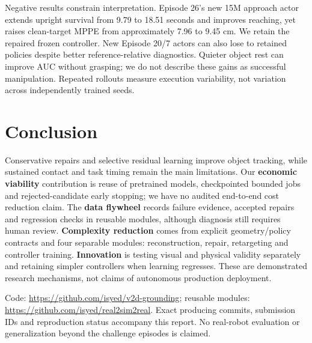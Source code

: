\documentclass[10pt]{nvidiaextabstract}
\begin{document}
Negative results constrain interpretation. Episode 26's new 15M approach actor
extends upright survival from 9.79 to 18.51 seconds and improves reaching, yet
raises clean-target MPPE from approximately 7.96 to 9.45 cm. We retain the
repaired frozen controller. New Episode 20/7 actors can also lose to retained
policies despite better reference-relative diagnostics. Quieter object rest
can improve AUC without grasping; we do not describe these gains as successful
manipulation. Repeated rollouts measure execution variability, not variation
across independently trained seeds.

\section{Conclusion}
Conservative repairs and selective residual learning improve object tracking,
while sustained contact and task timing remain the main limitations. Our
\textbf{economic viability} contribution is reuse of pretrained models,
checkpointed bounded jobs and rejected-candidate early stopping; we have no
audited end-to-end cost reduction claim. The \textbf{data flywheel} records
failure evidence, accepted repairs and regression checks in reusable modules,
although diagnosis still requires human review. \textbf{Complexity reduction}
comes from explicit geometry/policy contracts and four separable modules:
reconstruction, repair, retargeting and controller training.
\textbf{Innovation} is testing visual and physical validity separately and
retaining simpler controllers when learning regresses. These are demonstrated
research mechanisms, not claims of autonomous production deployment.

Code: \url{https://github.com/isyed/v2d-grounding}; reusable modules:
\url{https://github.com/isyed/real2sim2real}. Exact producing commits, submission
IDs and reproduction status accompany this report. No real-robot evaluation
or generalization beyond the challenge episodes is claimed.


\end{document}
